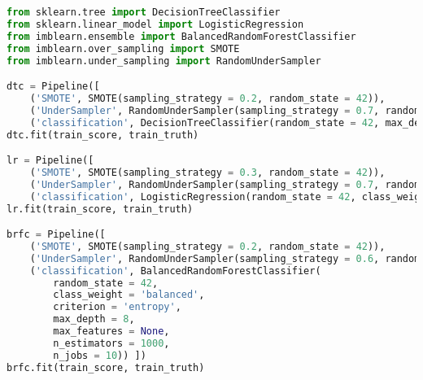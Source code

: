 \documentclass{standalone}
\begin{document}
\lstset{style=python}
	\begin{lstlisting}[language=python, caption=Training, label=training]
from sklearn.tree import DecisionTreeClassifier
from sklearn.linear_model import LogisticRegression
from imblearn.ensemble import BalancedRandomForestClassifier
from imblearn.over_sampling import SMOTE
from imblearn.under_sampling import RandomUnderSampler

dtc = Pipeline([
    ('SMOTE', SMOTE(sampling_strategy = 0.2, random_state = 42)),
    ('UnderSampler', RandomUnderSampler(sampling_strategy = 0.7, random_state = 42)),
    ('classification', DecisionTreeClassifier(random_state = 42, max_depth = 6, class_weight = 'balanced', criterion = 'entropy')) ])
dtc.fit(train_score, train_truth)

lr = Pipeline([
    ('SMOTE', SMOTE(sampling_strategy = 0.3, random_state = 42)),
    ('UnderSampler', RandomUnderSampler(sampling_strategy = 0.7, random_state = 42)),
    ('classification', LogisticRegression(random_state = 42, class_weight = 'balanced', penalty = None, solver = 'lbfgs', max_iter = 10000)) ])
lr.fit(train_score, train_truth)

brfc = Pipeline([
    ('SMOTE', SMOTE(sampling_strategy = 0.2, random_state = 42)),
    ('UnderSampler', RandomUnderSampler(sampling_strategy = 0.6, random_state = 42)),
    ('classification', BalancedRandomForestClassifier(
        random_state = 42, 
        class_weight = 'balanced',
        criterion = 'entropy', 
        max_depth = 8, 
        max_features = None,
        n_estimators = 1000,
        n_jobs = 10)) ])
brfc.fit(train_score, train_truth)
\end{lstlisting}
\end{document}
